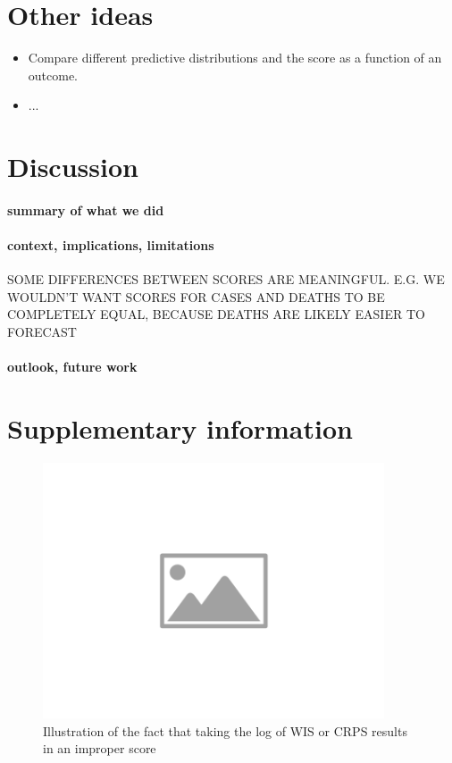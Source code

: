 \documentclass{article}
\begin{document}
\section{Other ideas}
\begin{itemize}
    \item Compare different predictive distributions and the score as a function of an outcome.
    \item ...
\end{itemize}




\section{Discussion}

\paragraph{summary of what we did}

\paragraph{context, implications, limitations}

SOME DIFFERENCES BETWEEN SCORES ARE MEANINGFUL. E.G. WE WOULDN'T WANT SCORES FOR CASES AND DEATHS TO BE COMPLETELY EQUAL, BECAUSE DEATHS ARE LIKELY EASIER TO FORECAST

\paragraph{outlook, future work}


 




\newpage

\appendix
\section{Supplementary information}

\begin{figure}[h!]
    \centering
    \includegraphics[width=0.9\textwidth]{output/placeholder-image.png}
    \caption{Illustration of the fact that taking the log of WIS or CRPS results in an improper score}
    \label{fig:log-improper}
\end{figure}
\end{document}
